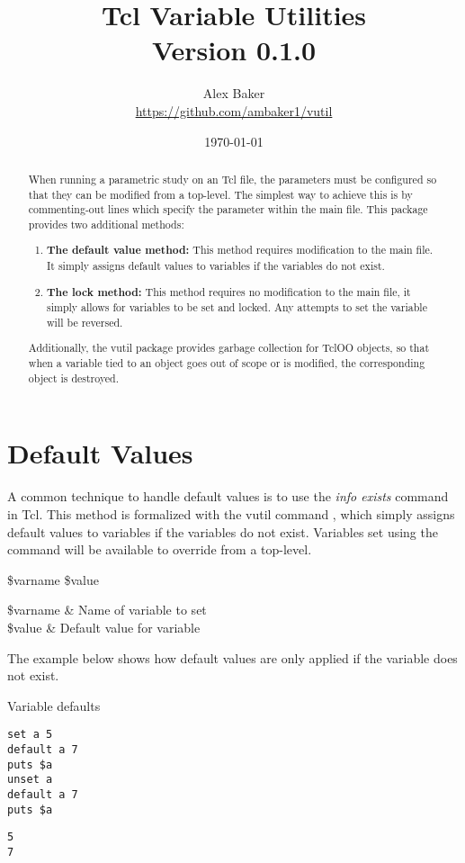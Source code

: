 \documentclass{article}
\title{\Huge Tcl Variable Utilities\\\small Version 0.1.0}
\author{Alex Baker\\\small\hyperlink{https://github.com/ambaker1/vutil}{https://github.com/ambaker1/vutil}}
\date{\small\today}
\renewcommand{\^}[1]{\textsuperscript{#1}}
\renewcommand{\_}[1]{\textsubscript{#1}}
\begin{document}
\maketitle
\begin{abstract}
When running a parametric study on an Tcl file, the parameters must be configured so that they can be modified from a top-level. 
The simplest way to achieve this is by commenting-out lines which specify the parameter within the main file. 
This package provides two additional methods:
\begin{enumerate}
\item \textbf{The default value method:} This method requires modification to the main file. 
It simply assigns default values to variables if the variables do not exist.
\item \textbf{The lock method:} This method requires no modification to the main file, it simply allows for variables to be set and locked. 
Any attempts to set the variable will be reversed.
\end{enumerate}
Additionally, the vutil package provides garbage collection for TclOO objects, so that when a variable tied to an object goes out of scope or is modified, the corresponding object is destroyed.
\end{abstract}
\clearpage
\section{Default Values}
A common technique to handle default values is to use the \textit{info exists} command in Tcl. This method is formalized with the vutil command , which simply assigns default values to variables if the variables do not exist. Variables set using the  command will be available to override from a top-level.

\begin{syntax}
 \$varname \$value
\end{syntax}
\begin{args}
\$varname & Name of variable to set \\
\$value & Default value for variable
\end{args}

The example below shows how default values are only applied if the variable does not exist.

\begin{example}{Variable defaults}
\begin{lstlisting}
set a 5
default a 7
puts $a
unset a
default a 7
puts $a
\end{lstlisting}
\tcblower
\begin{lstlisting}
5
7
\end{lstlisting}
\end{example}
\clearpage
\end{document}
